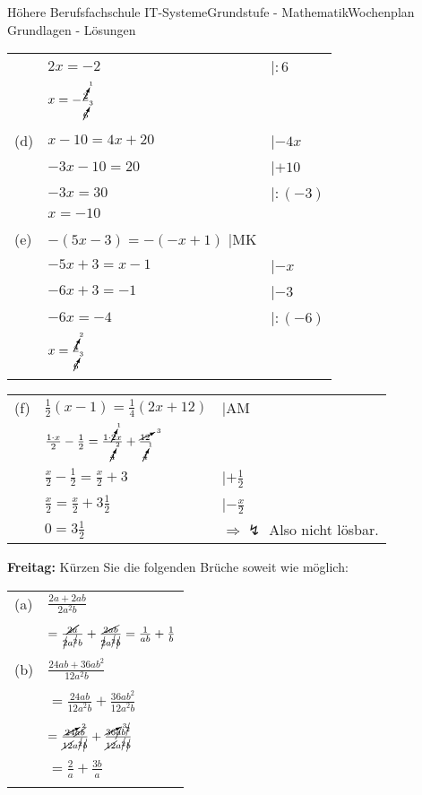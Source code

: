 \documentclass[oneside,openany,headings=optiontotoc,11pt,numbers=noenddot]{scrreprt}
\begin{document}
\begin{worksheet}{Höhere Berufsfachschule IT-Systeme}{Grundstufe - Mathematik}{Wochenplan Grundlagen - Lösungen}
\begin{framed}
\begin{tabularx}{\textwidth}{lll}
				& \(2x = -2\) & |\(:6\)\\
				& \(x = -\frac{\cancelto{1}{2}}{\cancelto{3}{6}}\)\\\\
				(d) & \(x-10 = 4x+20\) & |\(-4x\)\\
				& \(-3x -10 = 20\) & |\(+10\)\\
				& \(-3x = 30\) & |\(:(-3)\)\\
				& \(x = -10\)\\\\
				(e) & \(-(5x-3) =-(-x+1)\) |MK\\
				& \(-5x+3 = x-1\) & |\(-x\)\\
				& \(-6x + 3 = -1\) & |\(-3\)\\
				& \(-6x = -4\) & |\(:(-6)\)\\
				& \(x = \frac{\cancelto{2}{4}}{\cancelto{3}{6}}\)\\\\
			\end{tabularx}
			\begin{tabularx}{\textwidth}{lll}
				(f) & \(\frac{1}{2}(x-1) = \frac{1}{4}(2x+12)\) & |AM\\
				& \(\frac{1\cdot{}x}{2} - \frac{1}{2} = \frac{1\cdot{}\cancelto{1}{2}x}{\cancelto{2}{4}} + \frac{\cancelto{3}{12}}{\cancelto{1}{4}}\)\\
				& \(\frac{x}{2} - \frac{1}{2} = \frac{x}{2} + 3\) & |\(+\frac{1}{2}\)\\
				& \(\frac{x}{2} = \frac{x}{2} + 3\frac{1}{2}\) & |\(-\frac{x}{2}\)\\
				& \(0 = 3\frac{1}{2}\) & \(\Rightarrow \lightning\) Also nicht lösbar.
			\end{tabularx}
		\end{framed}
		\begin{framed}
			\noindent
			\textbf{Freitag:} Kürzen Sie die folgenden Brüche soweit wie möglich:\\
			\begin{tabularx}{\textwidth}{lX}
				(a) & \(\frac{2a+2ab}{2a^2b}\)\\\\
				& \(= \frac{\cancel{2a}}{\cancel{2}a^{\cancel{2}}b} + \frac{\cancel{2ab}}{\cancel{2}a^{\cancel{2}}\cancel{b}} = \frac{1}{ab} + \frac{1}{b}\)\\\\
				(b) & \(\frac{24ab + 36ab^2}{12a^2b}\)\\\\
				& \(= \frac{24ab}{12a^2b} + \frac{36ab^2}{12a^2b}\)\\\\
				& \(= \frac{\cancelto{2}{24}\cancel{ab}}{\cancel{12}a^{\cancel{2}}\cancel{b}} + \frac{\cancelto{3}{36}\cancel{a}b^{\cancel{2}}}{\cancel{12}a^{\cancel{2}}\cancel{b}}\)\\\\
				& \(= \frac{2}{a} + \frac{3b}{a}\)\\\\
				

\end{tabularx}
\end{framed}
\end{worksheet}
\end{document}
